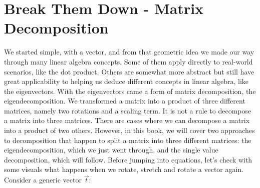 \documentclass[a4,12pt,twosided,openany]{memoir}
\begin{document}
\chapter{Break Them Down - Matrix Decomposition}
\par 
\indent
We started simple, with a vector, and from that geometric idea we made our way through many linear algebra concepts. Some of them apply directly to real-world scenarios, like the dot product. Others are somewhat more abstract but still have great applicability to helping us deduce different concepts in linear algebra, like the eigenvectors. With the eigenvectors came a form of matrix decomposition, the eigendecomposition. We transformed a matrix into a product of three different matrices, namely two rotations and a scaling term. It is not a rule to decompose a matrix into three matrices. There are cases where we can decompose a matrix into a product of two others. However, in this book, we will cover two approaches to decomposition that happen to split a matrix into three different matrices: the eigendecomposition, which we just went through, and the single value decomposition, which will follow. Before jumping into equations, let’s check with some visuals what happens when we rotate, stretch and rotate a vector again. Consider a generic vector $\overrightarrow{t}$:
\end{document}
